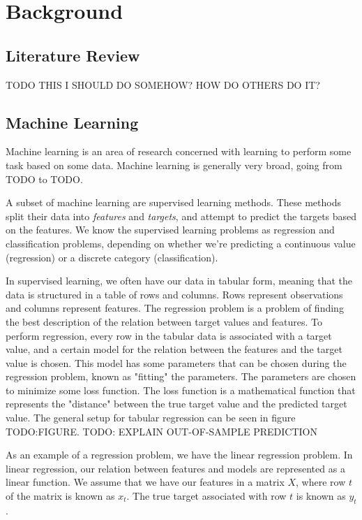 \chapter{Background}

\section{Literature Review}
TODO THIS I SHOULD DO SOMEHOW? HOW DO OTHERS DO IT?


\section{Machine Learning}
Machine learning is an area of research concerned with learning to perform some task based on some data. Machine learning is generally very broad, going from TODO to TODO.

A subset of machine learning are supervised learning methods. These methods
split their data into \emph{features} and \emph{targets}, and attempt to
predict the targets based on the features. We know the supervised learning
problems as regression and classification problems, depending on whether we're
predicting a continuous value (regression) or a discrete category
(classification).

In supervised learning, we often have our data in tabular form, meaning that
the data is structured in a table of rows and columns. Rows represent
observations and columns represent features. The regression problem is a
problem of finding the best description of the relation between target values
and features. To perform regression, every row in the tabular data is
associated with a target value, and a certain model for the relation between
the features and the target value is chosen. This model has some parameters
that can be chosen during the regression problem, known as "fitting" the
parameters. The parameters are chosen to minimize some loss function. The loss
function is a mathematical function that represents the "distance" between the
true target value and the predicted target value. The general setup for tabular
regression can be seen in figure TODO:FIGURE. TODO: EXPLAIN OUT-OF-SAMPLE PREDICTION

As an example of a regression problem, we have the linear regression problem.
In linear regression, our relation between features and models are represented
as a linear function. We assume that we have our features in a matrix $X$,
where row $t$ of the matrix is known as $x_t$. The true target associated with
row $t$ is known as $y_t$. 

